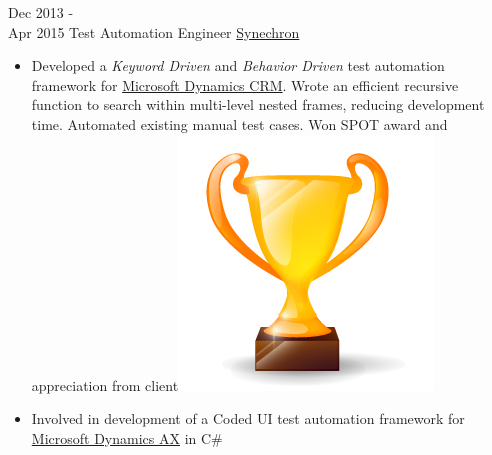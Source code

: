 \documentclass[letterpaper]{twentysecondcv} %
\begin{document}
\begin{twenty}
     \twentyitem
   		{Dec 2013 - \\ Apr 2015}
        {Test Automation Engineer}
        {\href{http://www.synechron.com/}{Synechron}}
        {}
        {
        \begin{itemize}
        \item Developed a \textit{Keyword Driven} and \textit{Behavior Driven} test automation framework for \href{https://www.microsoft.com/en-ca/dynamics/crm.aspx}{Microsoft Dynamics CRM}. Wrote an efficient recursive function to search within multi-level nested frames, reducing development time. Automated existing manual test cases. Won SPOT award and appreciation from client{\includegraphics[scale=0.05]{img/trophy.png}}
        \item Involved in development of a Coded UI test automation framework for \href{https://www.microsoft.com/en-ca/dynamics/erp-ax-overview.aspx}{Microsoft Dynamics AX} in C\#
    \end{itemize}
    	}
        
\end{twenty}
\end{document}
